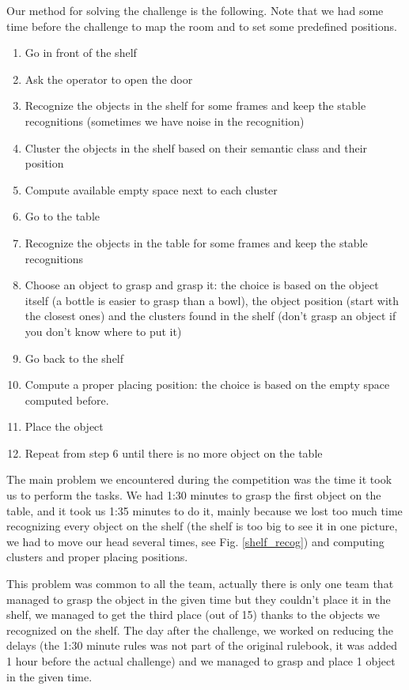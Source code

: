 \documentclass[a4paper, twocolumn]{article}
\begin{document}
    Our method for solving the challenge is the following. Note that we had some time before the challenge to map the room and to set some predefined positions.
    \begin{enumerate}
        \item Go in front of the shelf
        \item Ask the operator to open the door
        \item Recognize the objects in the shelf for some frames and keep the stable recognitions (sometimes we have noise in the recognition)
        \item Cluster the objects in the shelf based on their semantic class and their position
        \item Compute available empty space next to each cluster
        \item Go to the table
        \item Recognize the objects in the table for some frames and keep the stable recognitions
        \item Choose an object to grasp and grasp it: the choice is based on the object itself (a bottle is easier to grasp than a bowl), the object position (start with the closest ones) and the clusters found in the shelf (don't grasp an object if you don't know where to put it)
        \item Go back to the shelf
        \item Compute a proper placing position: the choice is based on the empty space computed before.
        \item Place the object
        \item Repeat from step 6 until there is no more object on the table
    \end{enumerate}

    The main problem we encountered during the competition was the time it took us to perform the tasks. We had 1:30 minutes to grasp the first object on the table, and it took us 1:35 minutes to do it, mainly because we lost too much time recognizing every object on the shelf (the shelf is too big to see it in one picture, we had to move our head several times, see Fig. \ref{shelf_recog}) and computing clusters and proper placing positions.

    This problem was common to all the team, actually there is only one team that managed to grasp the object in the given time but they couldn't place it in the shelf, we managed to get the third place (out of 15) thanks to the objects we recognized on the shelf. The day after the challenge, we worked on reducing the delays (the 1:30 minute rules was not part of the original rulebook, it was added 1 hour before the actual challenge) and we managed to grasp and place 1 object in the given time.
\end{document}
